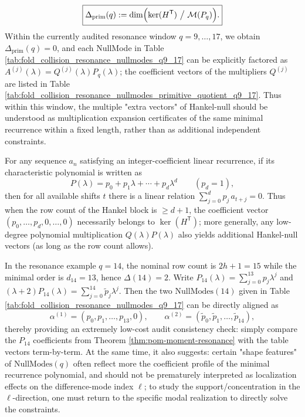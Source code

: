 \begin{remark}
\[
\boxed{
\Delta_{\mathrm{prim}}(q):=\dim\Bigl(\ker(H^{\mathsf T})\ \big/\ \mathcal{M}(P_q)\Bigr).
}
\]
Within the currently audited resonance window \(q=9,\dots,17\), we obtain \(\Delta_{\mathrm{prim}}(q)=0\), and each NullMode in Table \ref{tab:fold_collision_resonance_nullmodes_q9_17} can be explicitly factored as
\(
A^{(j)}(\lambda)=Q^{(j)}(\lambda)P_q(\lambda)
\);
the coefficient vectors of the multipliers \(Q^{(j)}\) are listed in Table \ref{tab:fold_collision_resonance_nullmodes_primitive_quotient_q9_17}.
Thus within this window, the multiple "extra vectors" of Hankel-null should be understood as multiplication expansion certificates of the same minimal recurrence within a fixed length, rather than as additional independent constraints.
\end{remark}

\begin{remark}[Alignment of Hankel-null with characteristic polynomial: the case \texorpdfstring{$q=14$}{q=14} as example]\label{rem:pom-nullmodes-q14-poly-alignment}
For any sequence \(a_n\) satisfying an integer-coefficient linear recurrence, if its characteristic polynomial is written as
\[
P(\lambda)=p_0+p_1\lambda+\cdots+p_d\lambda^d\qquad(p_d=1),
\]
then for all available shifts \(t\) there is a linear relation
\(
\sum_{j=0}^{d} p_j\,a_{t+j}=0
\).
Thus when the row count of the Hankel block is \(\ge d+1\), the coefficient vector \((p_0,\dots,p_d,0,\dots,0)\) necessarily belongs to \(\ker(H^{\mathsf T})\);
more generally, any low-degree polynomial multiplication \(Q(\lambda)P(\lambda)\) also yields additional Hankel-null vectors (as long as the row count allows).
\par
In the resonance example \(q=14\), the nominal row count is \(2h+1=15\) while the minimal order is \(d_{14}=13\), hence \(\Delta(14)=2\).
Write
\(
P_{14}(\lambda)=\sum_{j=0}^{13}p_j\lambda^j
\)
and
\(
(\lambda+2)P_{14}(\lambda)=\sum_{j=0}^{14}\widetilde p_j\lambda^j
\).
Then the two \(\mathrm{NullModes}(14)\) given in Table \ref{tab:fold_collision_resonance_nullmodes_q9_17} can be directly aligned as
\[
\alpha^{(1)}=(p_0,p_1,\ldots,p_{13},0),
\qquad
\alpha^{(2)}=(\widetilde p_0,\widetilde p_1,\ldots,\widetilde p_{14}),
\]
thereby providing an extremely low-cost audit consistency check: simply compare the \(P_{14}\) coefficients from Theorem \ref{thm:pom-moment-resonance} with the table vectors term-by-term.
At the same time, it also suggests: certain "shape features" of \(\mathrm{NullModes}(q)\) often reflect more the coefficient profile of the minimal recurrence polynomial, and should not be prematurely interpreted as localization effects on the difference-mode index \(\ell\);
to study the support/concentration in the \(\ell\)-direction, one must return to the specific modal realization to directly solve the constraints.
\end{remark}

